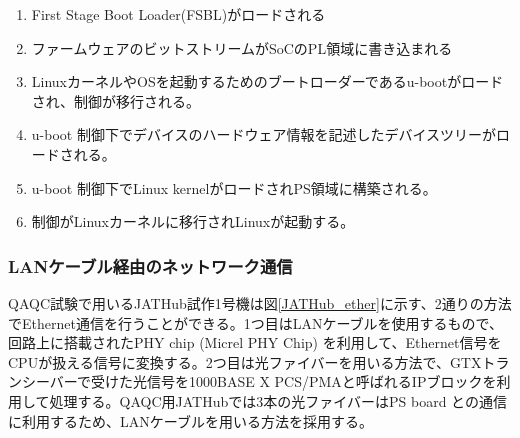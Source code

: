 \begin{enumerate}
    \item First Stage Boot Loader(FSBL)がロードされる
    \item ファームウェアのビットストリームがSoCのPL領域に書き込まれる
    \item LinuxカーネルやOSを起動するためのブートローダーであるu-bootがロードされ、制御が移行される。
    \item u-boot 制御下でデバイスのハードウェア情報を記述したデバイスツリーがロードされる。
    \item u-boot 制御下でLinux kernelがロードされPS領域に構築される。
    \item 制御がLinuxカーネルに移行されLinuxが起動する。
\end{enumerate}

\subsubsection{LANケーブル経由のネットワーク通信}
\baselineskip
\label{subsubsec_network}
QAQC試験で用いるJATHub試作1号機は図\ref{JATHub_ether}に示す、2通りの方法でEthernet通信を行うことができる。1つ目はLANケーブルを使用するもので、回路上に搭載されたPHY chip (Micrel PHY Chip) を利用して、Ethernet信号をCPUが扱える信号に変換する。2つ目は光ファイバーを用いる方法で、GTXトランシーバーで受けた光信号を1000BASE X PCS/PMAと呼ばれるIPブロックを利用して処理する。QAQC用JATHubでは3本の光ファイバーはPS board との通信に利用するため、LANケーブルを用いる方法を採用する。


